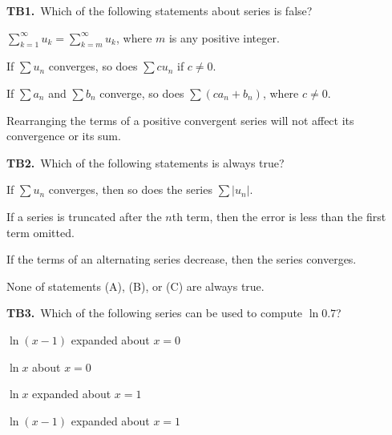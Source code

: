 \documentclass[11pt]{article}
\begin{document}
\bigskip\noindent\textbf{TB1.}\ Which of the following statements about series is false?
\begin{list}{}{\setlength{\leftmargin}{3em}\setlength{\labelwidth}{2.5em}\setlength{\itemsep}{0pt}\setlength{\topsep}{2pt}}
\item[(A)] $\displaystyle\sum_{k=1}^\infty u_k = \displaystyle\sum_{k=m}^\infty u_k$, where $m$ is any positive integer.
\item[(B)] If $\displaystyle\sum u_n$ converges, so does $\displaystyle\sum cu_n$ if $c\neq 0$.
\item[(C)] If $\displaystyle\sum a_n$ and $\displaystyle\sum b_n$ converge, so does $\displaystyle\sum(ca_n+b_n)$, where $c\neq 0$.
\item[(D)] Rearranging the terms of a positive convergent series will not affect its convergence or its sum.
\end{list}

\bigskip\noindent\textbf{TB2.}\ Which of the following statements is always true?
\begin{list}{}{\setlength{\leftmargin}{3em}\setlength{\labelwidth}{2.5em}\setlength{\itemsep}{0pt}\setlength{\topsep}{2pt}}
\item[(A)] If $\displaystyle\sum u_n$ converges, then so does the series $\displaystyle\sum |u_n|$.
\item[(B)] If a series is truncated after the $n$th term, then the error is less than the first term omitted.
\item[(C)] If the terms of an alternating series decrease, then the series converges.
\item[(D)] None of statements (A), (B), or (C) are always true.
\end{list}

\bigskip\noindent\textbf{TB3.}\ Which of the following series can be used to compute $\ln 0.7$?
\begin{list}{}{\setlength{\leftmargin}{3em}\setlength{\labelwidth}{2.5em}\setlength{\itemsep}{0pt}\setlength{\topsep}{2pt}}
\item[(A)] $\ln(x-1)$ expanded about $x=0$
\item[(B)] $\ln x$ about $x=0$
\item[(C)] $\ln x$ expanded about $x=1$
\item[(D)] $\ln(x-1)$ expanded about $x=1$
\end{list}
\end{document}
